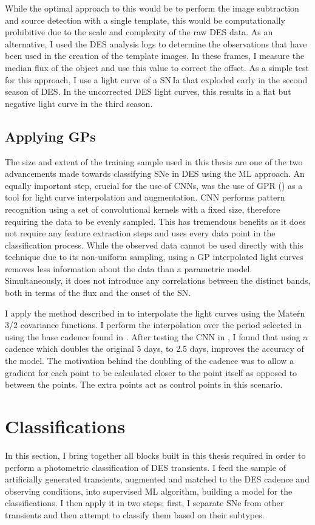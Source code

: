 While the optimal approach to this would be to perform the image subtraction and source detection with a single template, this would be computationally prohibitive due to the scale and complexity of the raw DES data. As an alternative, I used the DES analysis logs to determine the observations that have been used in the creation of the template images. In these frames, I measure the median flux of the object and use this value to correct the offset. As a simple test for this approach, I use a light curve of a SN\,Ia that exploded early in the second season of DES. In the uncorrected DES light curves, this results in a flat but negative light curve in the third season.

\subsection{Applying GPs} \label{sec:UseGP}
The size and extent of the training sample used in this thesis are one of the two advancements made towards classifying SNe in DES using the ML approach. An equally important step, crucial for the use of CNNs, was the use of GPR () as a tool for light curve interpolation and augmentation. CNN performs pattern recognition using a set of convolutional kernels with a fixed size, therefore requiring the data to be evenly sampled. This has tremendous benefits as it does not require any feature extraction steps and uses every data point in the classification process. While the observed data cannot be used directly with this technique due to its non-uniform sampling, using a GP interpolated light curves removes less information about the data than a parametric model. Simultaneously, it does not introduce any correlations between the distinct bands, both in terms of the flux and the onset of the SN.

I apply the method described in  to interpolate the light curves using the Mate\'rn 3/2 covariance functions. I perform the interpolation over the period selected in  using the base cadence found in . After testing the CNN in , I found that using a cadence which doubles the original 5 days, to 2.5 days, improves the accuracy of the model. The motivation behind the doubling of the cadence was to allow a gradient for each point to be calculated closer to the point itself as opposed to between the points. The extra points act as control points in this scenario.

\section{Classifications} \label{sec:CNN}
In this section, I bring together all blocks built in this thesis required in order to perform a photometric classification of DES transients. I feed the sample of artificially generated transients, augmented and matched to the DES cadence and observing conditions, into supervised ML algorithm, building a model for the classifications. I then apply it in two steps; first, I separate SNe from other transients and then attempt to classify them based on their subtypes.

